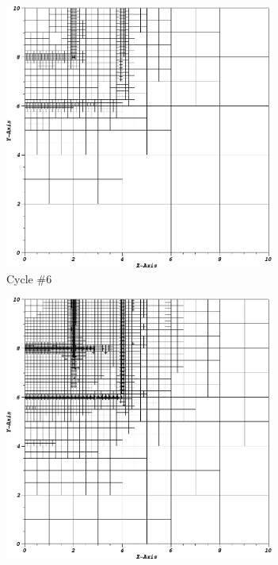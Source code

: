 \begin{figure}
\centering
	\begin{subfigure}[b]{0.485\textwidth}
		\centering
		\includegraphics[width=0.975\textwidth]{figures/sec_DSA/IW_PWLD2_PGLC24_cyc06.png}
		\caption{Cycle \#6}
	\end{subfigure}
	\hfill
	\begin{subfigure}[b]{0.485\textwidth}
		\centering
		\includegraphics[width=0.975\textwidth]{figures/sec_DSA/IW_PWLD2_PGLC24_cyc12.png}

\end{subfigure}
\end{figure}
